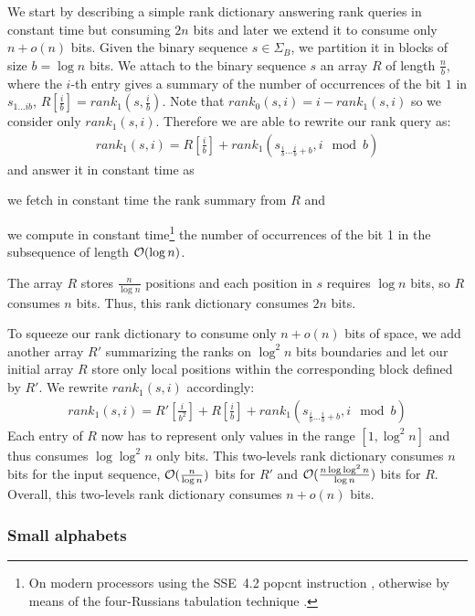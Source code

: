 We start by describing a simple rank dictionary answering rank queries in constant time but consuming $2n$ bits and later we extend it to consume only $n + o(n)$ bits.
Given the binary sequence $s \in \Sigma_B$, we partition it in blocks of size $b=\log{n}$ bits.
We attach to the binary sequence $s$ an array $R$ of length $\frac{n}{b}$, where the $i$-th entry gives a summary of the number of occurrences of the bit $1$ in $s_{1 \dots i b}$, \ie $R[\frac{i}{b}] = rank_1(s, \frac{i}{b})$.
Note that $rank_0(s, i) = i - rank_1(s, i)$ so we consider only $rank_1(s, i)$.
Therefore we are able to rewrite our rank query as:
\begin{eqnarray}
rank_1(s,i) = R[\frac{i}{b}] + rank_1(s_{\frac{i}{b} \dots \frac{i}{b}+b}, i \mod{b})
\end{eqnarray}
and answer it in constant time as 
\begin{inparaenum}[(i)]
\item \label{itm:fetch} we fetch in constant time the rank summary from $R$ and
\item \label{itm:count} we compute in constant time\footnote{On modern processors using the SSE~4.2 popcnt instruction \citep{Intel}, otherwise by means of the four-Russians tabulation technique \citep{Arlazarov1975}.} the number of occurrences of the bit 1 in the subsequence of length $\mathcal{O}(\log{n})$.
\end{inparaenum}
The array $R$ stores $\frac{n}{\log{n}}$ positions and each position in $s$ requires $\log{n}$ bits, so $R$ consumes $n$ bits.
Thus, this rank dictionary consumes $2n$ bits.

To squeeze our rank dictionary to consume only $n+o(n)$ bits of space, we add another array $R'$ summarizing the ranks on $\log^2{n}$ bits boundaries and let our initial array $R$ store only local positions within the corresponding block defined by $R'$.
We rewrite $rank_1(s,i)$ accordingly:
\begin{eqnarray}
rank_1(s,i) = R'[\frac{i}{b^2}] + R[\frac{i}{b}] + rank_1(s_{\frac{i}{b} \dots \frac{i}{b}+b}, i \mod{b})
\end{eqnarray}
Each entry of $R$ now has to represent only values in the range $[1,\log^2{n}]$ and thus consumes $\log{\log^2{n}}$ only bits.
This two-levels rank dictionary consumes $n$ bits for the input sequence, $\mathcal{O}(\frac{n}{\log{n}})$ bits for $R'$ and $\mathcal{O}(\frac{n \log{\log^2{n}}}{\log{n}})$ bits for $R$.
Overall, this two-levels rank dictionary consumes $n + o(n)$ bits.

\subsubsection{Small alphabets}

